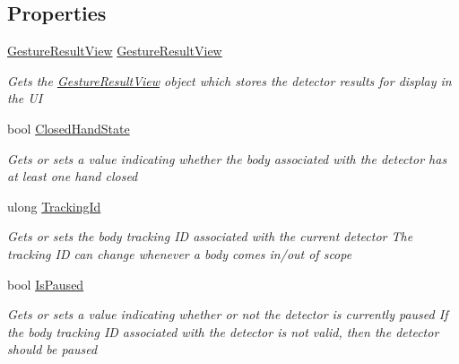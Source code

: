 \subsection*{Properties}
\begin{DoxyCompactItemize}
\item 
\hyperlink{class_microsoft_1_1_samples_1_1_kinect_1_1_kinect_security_system_1_1_gesture_result_view}{Gesture\+Result\+View} \hyperlink{class_microsoft_1_1_samples_1_1_kinect_1_1_kinect_security_system_1_1_gesture_detector_a40558db94165f47ad3526f24d2f52f6c}{Gesture\+Result\+View}
\begin{DoxyCompactList}\small\item\em Gets the \hyperlink{class_microsoft_1_1_samples_1_1_kinect_1_1_kinect_security_system_1_1_gesture_result_view}{Gesture\+Result\+View} object which stores the detector results for display in the UI \end{DoxyCompactList}\item 
bool \hyperlink{class_microsoft_1_1_samples_1_1_kinect_1_1_kinect_security_system_1_1_gesture_detector_a4a4d7870b3fe47c605bb336ce8b08e6b}{Closed\+Hand\+State}
\begin{DoxyCompactList}\small\item\em Gets or sets a value indicating whether the body associated with the detector has at least one hand closed \end{DoxyCompactList}\item 
ulong \hyperlink{class_microsoft_1_1_samples_1_1_kinect_1_1_kinect_security_system_1_1_gesture_detector_a4ea0f9304d3588e60a6d0e8a2832cb9c}{Tracking\+Id}
\begin{DoxyCompactList}\small\item\em Gets or sets the body tracking ID associated with the current detector The tracking ID can change whenever a body comes in/out of scope \end{DoxyCompactList}\item 
bool \hyperlink{class_microsoft_1_1_samples_1_1_kinect_1_1_kinect_security_system_1_1_gesture_detector_a3cfd7fc3420ca6e027e150b9bc66cd53}{Is\+Paused}
\begin{DoxyCompactList}\small\item\em Gets or sets a value indicating whether or not the detector is currently paused If the body tracking ID associated with the detector is not valid, then the detector should be paused \end{DoxyCompactList}\end{DoxyCompactItemize}


